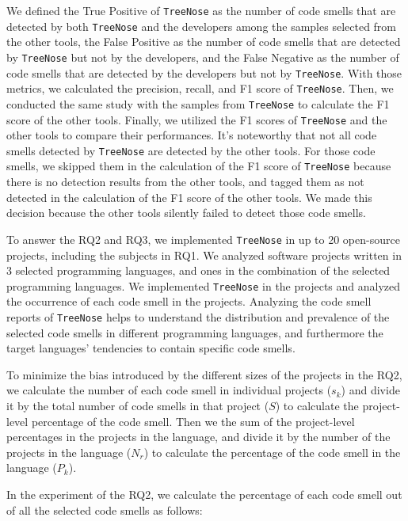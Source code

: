We defined the True Positive of \texttt{TreeNose} as the number of code smells
that are detected by both \texttt{TreeNose} and the developers among the
samples selected from the other tools, the False Positive as the number of code
smells that are detected by \texttt{TreeNose} but not by the developers, and
the False Negative as the number of code smells that are detected by the
developers but not by \texttt{TreeNose}. With those metrics, we calculated the
precision, recall, and F1 score of \texttt{TreeNose}. Then, we conducted the
same study with the samples from \texttt{TreeNose} to calculate the F1 score of
the other tools. Finally, we utilized the F1 scores of \texttt{TreeNose} and
the other tools to compare their performances. It's noteworthy that not all
code smells detected by \texttt{TreeNose} are detected by the other tools. For
those code smells, we skipped them in the calculation of the F1 score of
\texttt{TreeNose} because there is no detection results from the other tools,
and tagged them as not detected in the calculation of the F1 score of the other
tools. We made this decision because the other tools silently failed to detect
those code smells.


To answer the RQ2 and RQ3, we implemented \texttt{TreeNose} in up to 20
open-source projects, including the subjects in RQ1. We analyzed software
projects written in 3 selected programming languages, and ones in the
combination of the selected programming languages. We implemented
\texttt{TreeNose} in the projects and analyzed the occurrence of each code
smell in the projects. Analyzing the code smell reports of \texttt{TreeNose}
helps to understand the distribution and prevalence of the selected code smells
in different programming languages, and furthermore the target languages'
tendencies to contain specific code smells.

To minimize the bias introduced by the different sizes of the projects in the
RQ2, we calculate the number of each code smell in individual projects
($s_{k}$) and divide it by the total number of code smells in that project
({$S$}) to calculate the project-level percentage of the code smell. Then we
the sum of the project-level percentages in the projects in the language, and
divide it by the number of the projects in the language ($N_r$) to calculate
the percentage of the code smell in the language ($P_{k}$).

In the experiment of the RQ2, we calculate the percentage of each code smell
out of all the selected code smells as follows:

